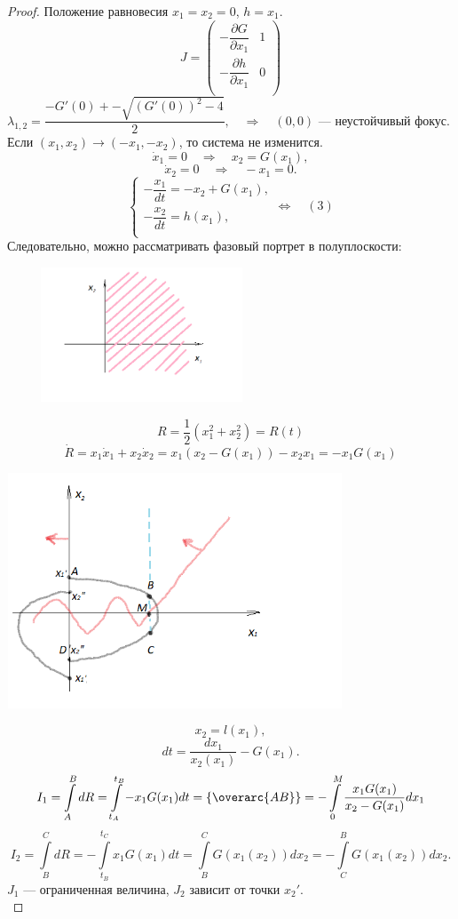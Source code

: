  	\begin{proof}
 		Положение равновесия \(x_1 = x_2 = 0\), \(h=x_1\).\\
 		\[
 		J = \begin{pmatrix}
 		-\dfrac{\partial G}{\partial x_1}	 &  1\\
 		-\dfrac{\partial h}{\partial x_1} & 0 \\
 		\end{pmatrix}
 		\]
 		\(
 		\lambda_{1,2} = \dfrac{-G'(0) +- \sqrt{(G'(0))^2-4}}{2}, \quad \Rightarrow \quad (0,0)\) --- неустойчивый фокус.\\
 		Если \((x_1, x_2) \rightarrow (-x_1, -x_2)\), то система не изменится.
 		\[
 		\dot x_1 = 0 \quad \Rightarrow \quad x_2 = G(x_1),
 		\]
 		\[
 		\dot x_2 = 0  \quad \Rightarrow \quad -x_1 = 0.
 		\]
 		\[
 		\begin{cases}
 		-\dfrac{x_1}{dt} = -x_2 + G(x_1), \\
 		-\dfrac{x_2}{dt} = h(x_1),\\
 		\end{cases}
 		\Leftrightarrow \quad  (3)
 		\]
 		Следовательно, можно рассматривать фазовый портрет в полуплоскости:
 		\begin{center}
 			\includegraphics[width=8cm, height=4cm]{ch10/7}
 		\end{center}
 		\[
 		R = \dfrac{1}{2}(x_1^2 + x_2^2)  =R(t)
 		\]
 		\[
 		\dot R = x_1 \dot x_1 +x_2 \dot x_2 = x_1(x_2 - G(x_1))-x_2 x_1 = -x_1G(x_1)
 		\]\begin{center}
 			\includegraphics[width=10cm, height=7cm]{ch10/8}
 		\end{center}
 		\[
 		x_2 = l(x_1),
 		\]
 		\[
 		dt = \dfrac{dx_1}{x_2(x_1)} - G(x_1).
 		\]
 		\[
 		I_1 = \int\limits_A^B dR = \int \limits_{t_A}^{t_B} -x_1 G(x_1) dt = \{\overarc{AB}\} = -\int \limits_0^{M}\dfrac{x_1G(x_1)}{x_2 - G(x_1)}dx_1
 		\]
 		\[
 		I_2 = \int \limits_B^C dR = -\int \limits_{t_B}^{t_C} x_1 G(x_1) dt = \int \limits_B^C G(x_1(x_2)) dx_2= -\int\limits_C^B G(x_1(x_2))dx_2.
 		\]
 		\(
 		J_1\) --- ограниченная величина, \(J_2\) зависит от точки \(x_2'\).\\
 		

\end{proof}
